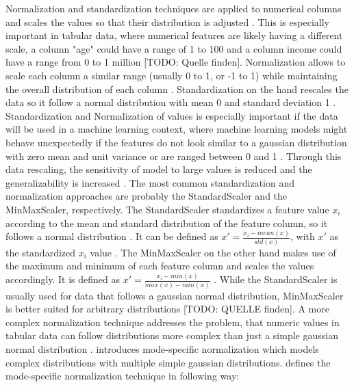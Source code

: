 \label{sec:dataNormalization} 

Normalization and standardization techniques are applied to numerical columns and scales the values so that their distribution is adjusted \cite{garcia2016BigDataPreprocessing}.
This is especially important in tabular data, where numerical features are likely having a different scale, \eg a column "age" could have a range of 1 to 100 and a column income could have a range from 0 to 1 million [TODO: Quelle finden].
Normalization allows to scale each column a similar range (usually 0 to 1, or -1 to 1) while maintaining the overall distribution of each column \cite{izonin2022TwoStepDataNormalization}.
Standardization on the hand rescales the data so it follow a normal distribution with mean 0 and standard deviation 1 \cite{scikit-learnPreprocessingData}.
Standardization and Normalization of values is especially important if the data will be used in a machine learning context, where machine learning models might behave unexpectedly if 
the features do not look similar to a gaussian distribution with zero mean and unit variance or are ranged between 0 and 1 \cite{scikit-learn, scikit-learnPreprocessingData}.
Through this data rescaling, the sensitivity of \gls{model} to large values is reduced and the generalizability is increased \cite{izonin2022TwoStepDataNormalization}.
The most common standardization and normalization approaches are probably the StandardScaler and the MinMaxScaler, respectively.
The StandardScaler standardizes a feature value $x_i$ according to the mean and standard distribution of the feature column, so it follows a normal distribution \cite{garcia2016BigDataPreprocessing, izonin2022TwoStepDataNormalization}.
It can be defined as $x' = \frac{x_i-mean(x)}{std(x)}$, with $x'$ as the standardized $x_i$ value \cite{izonin2022TwoStepDataNormalization}.
The MinMaxScaler on the other hand makes use of the maximum and minimum of each feature column and scales the values accordingly.
It is defined as $x' = \frac{x_i - min(x)}{max(x) - min(x)}$ \cite{izonin2022TwoStepDataNormalization}.
While the StandardScaler is usually used for data that follows a gaussian normal distribution, MinMaxScaler is better suited for arbitrary distributions [TODO: QUELLE finden].
A more complex normalization technique addresses the problem, that numeric values in tabular data can follow distributions more complex than just a simple gaussian normal distribution \cite{zhao2022CTABGANEnhancingTabular, xu2019ModelingTabularData}.
\cite{xu2019ModelingTabularData} introduces mode-specific normalization which models complex distributions with multiple simple gaussian distributions.
\cite[p. 3-4]{xu2019ModelingTabularData} defines the mode-specific normalization technique in following way:

